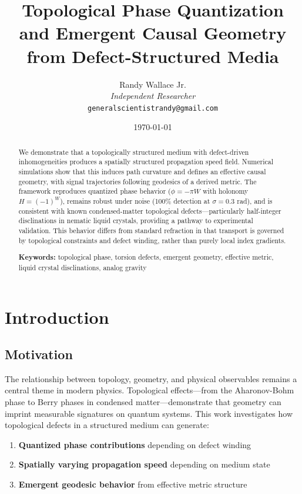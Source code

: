 \documentclass[11pt,a4paper]{article}
\title{\textbf{Topological Phase Quantization and Emergent Causal Geometry\\from Defect-Structured Media}}
\author{Randy Wallace Jr.\\
\textit{Independent Researcher}\\
\texttt{generalscientistrandy@gmail.com}}
\date{\today}
\begin{document}
\maketitle

\begin{abstract}
We demonstrate that a topologically structured medium with defect-driven inhomogeneities produces a spatially structured propagation speed field. Numerical simulations show that this induces path curvature and defines an effective causal geometry, with signal trajectories following geodesics of a derived metric. The framework reproduces quantized phase behavior ($\phi = -\pi W$ with holonomy $H = (-1)^W$), remains robust under noise (100\% detection at $\sigma = 0.3$ rad), and is consistent with known condensed-matter topological defects---particularly half-integer disclinations in nematic liquid crystals, providing a pathway to experimental validation. This behavior differs from standard refraction in that transport is governed by topological constraints and defect winding, rather than purely local index gradients.

\vspace{0.5em}
\noindent\textbf{Keywords:} topological phase, torsion defects, emergent geometry, effective metric, liquid crystal disclinations, analog gravity
\end{abstract}

\section{Introduction}

\subsection{Motivation}

The relationship between topology, geometry, and physical observables remains a central theme in modern physics. Topological effects---from the Aharonov-Bohm phase to Berry phases in condensed matter---demonstrate that geometry can imprint measurable signatures on quantum systems. This work investigates how topological defects in a structured medium can generate:

\begin{enumerate}
    \item \textbf{Quantized phase contributions} depending on defect winding
    \item \textbf{Spatially varying propagation speed} depending on medium state
    \item \textbf{Emergent geodesic behavior} from effective metric structure
\end{enumerate}
\end{document}

